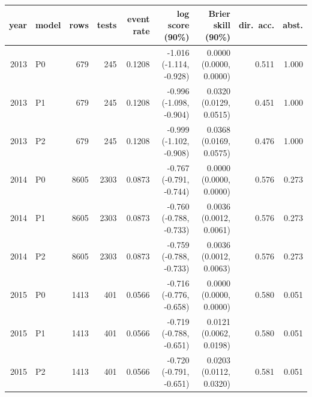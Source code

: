 \begin{tabular}{rlrrrrrrr}
\toprule
year & model & rows & tests & event rate & log score (90\%) & Brier skill (90\%) & dir.\ acc. & abst. \\
\midrule
2013 & P0 & 679 & 245 & 0.1208 & -1.016 (-1.114, -0.928) & 0.0000 (0.0000, 0.0000) & 0.511 & 1.000 \\
2013 & P1 & 679 & 245 & 0.1208 & -0.996 (-1.098, -0.904) & 0.0320 (0.0129, 0.0515) & 0.451 & 1.000 \\
2013 & P2 & 679 & 245 & 0.1208 & -0.999 (-1.102, -0.908) & 0.0368 (0.0169, 0.0575) & 0.476 & 1.000 \\
2014 & P0 & 8605 & 2303 & 0.0873 & -0.767 (-0.791, -0.744) & 0.0000 (0.0000, 0.0000) & 0.576 & 0.273 \\
2014 & P1 & 8605 & 2303 & 0.0873 & -0.760 (-0.788, -0.733) & 0.0036 (0.0012, 0.0061) & 0.576 & 0.273 \\
2014 & P2 & 8605 & 2303 & 0.0873 & -0.759 (-0.788, -0.733) & 0.0036 (0.0012, 0.0063) & 0.576 & 0.273 \\
2015 & P0 & 1413 & 401 & 0.0566 & -0.716 (-0.776, -0.658) & 0.0000 (0.0000, 0.0000) & 0.580 & 0.051 \\
2015 & P1 & 1413 & 401 & 0.0566 & -0.719 (-0.788, -0.651) & 0.0121 (0.0062, 0.0198) & 0.580 & 0.051 \\
2015 & P2 & 1413 & 401 & 0.0566 & -0.720 (-0.791, -0.651) & 0.0203 (0.0112, 0.0320) & 0.581 & 0.051 \\
\bottomrule
\end{tabular}
